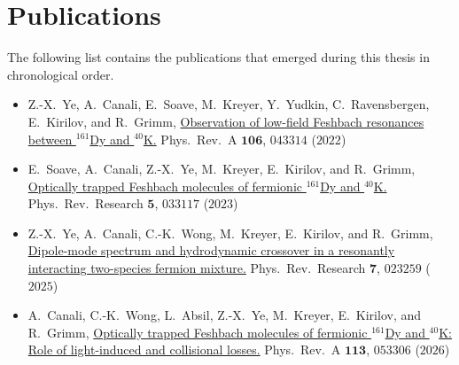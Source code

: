 \chapter*{Publications}
\noindent The following list contains the publications that emerged during this thesis in chronological order.


\begin{itemize}
	\item Z.-X.~Ye, A.~Canali, E.~Soave, M.~Kreyer, Y.~Yudkin, C.~Ravensbergen, E.~Kirilov, and R.~Grimm, \href{DOI: 10.1103/PhysRevA.106.043314}{Observation of low-field Feshbach resonances between $^{161}$Dy and $^{40}$K.} Phys.~Rev.~A $\boldsymbol{106}$, $043314$ ($2022$)
	\item E.~Soave, A.~Canali, Z.-X.~Ye, M.~Kreyer, E.~Kirilov, and R.~Grimm, \href{https://doi.org/10.1103/PhysRevResearch.5.033117}{Optically trapped Feshbach molecules of fermionic $^{161}$Dy and $^{40}$K.} Phys.~Rev.~Research $\boldsymbol{5}$, $033117$ ($2023$)
	\item Z.-X.~Ye, A.~Canali, C.-K.~Wong, M.~Kreyer, E.~Kirilov, and R.~Grimm, \href{https://doi.org/10.1103/PhysRevResearch.7.023259}{Dipole-mode spectrum and hydrodynamic crossover in a resonantly interacting two-species fermion mixture.} Phys.~Rev.~Research $\boldsymbol{7}$, $023259$ ($2025$)
	\item A.~Canali, C.-K.~Wong, L.~Absil, Z.-X.~Ye, M.~Kreyer, E.~Kirilov, and R.~Grimm, \href{https://doi.org/10.1103/ftpc-qq4c}{Optically trapped Feshbach molecules of fermionic $^{161}$Dy and $^{40}$K: Role of light-induced and collisional losses.} Phys.~Rev.~A $\boldsymbol{113}$, $053306 $ ($2026$)
\end{itemize}





